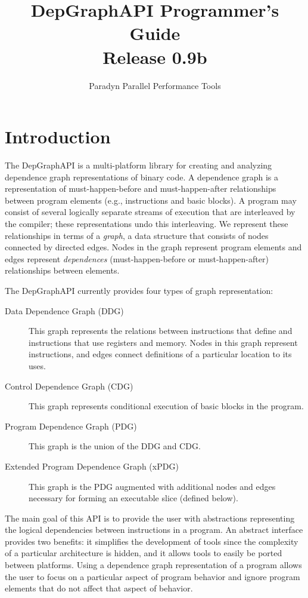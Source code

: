 \documentclass[12pt,titlepage]{article}
\begin{document}
\title{DepGraphAPI Programmer's Guide \\ Release 0.9b}
\author{Paradyn Parallel Performance Tools}
\maketitle
\tableofcontents
\section{Introduction}

The DepGraphAPI is a multi-platform library for creating and analyzing
dependence graph representations of binary code. A dependence graph is
a representation of must-happen-before and must-happen-after
relationships between program elements (e.g., instructions and basic
blocks). A program may consist of several logically separate streams
of execution that are interleaved by the compiler; these
representations undo this interleaving. We represent these
relationships in terms of a \emph{graph}, a data structure that
consists of nodes connected by directed edges. Nodes in the graph
represent program elements and edges represent \emph{dependences}
(must-happen-before or must-happen-after) relationships between
elements.

The DepGraphAPI currently provides four types of graph representation:
\begin{description}
\item[Data Dependence Graph (DDG)] This graph represents the relations
between instructions that define and instructions that use registers
and memory. Nodes in this graph represent instructions, and edges
connect definitions of a particular location to its uses.
\item[Control Dependence Graph (CDG)] This graph represents
conditional execution of basic blocks in the program.
\item[Program Dependence Graph (PDG)] This graph is the union of the
DDG and CDG.
\item[Extended Program Dependence Graph (xPDG)] This graph is the PDG
augmented with additional nodes and edges necessary for forming an
executable slice (defined below).
\end{description}

The main goal of this API is to provide the user with abstractions
representing the logical dependencies between instructions in a
program. An abstract interface provides two benefits: it simplifies
the development of tools since the complexity of a particular
architecture is hidden, and it allows tools to easily be ported
between platforms. Using a dependence graph representation of a
program allows the user to focus on a particular aspect of program
behavior and ignore program elements that do not affect that aspect of
behavior.
\end{document}
